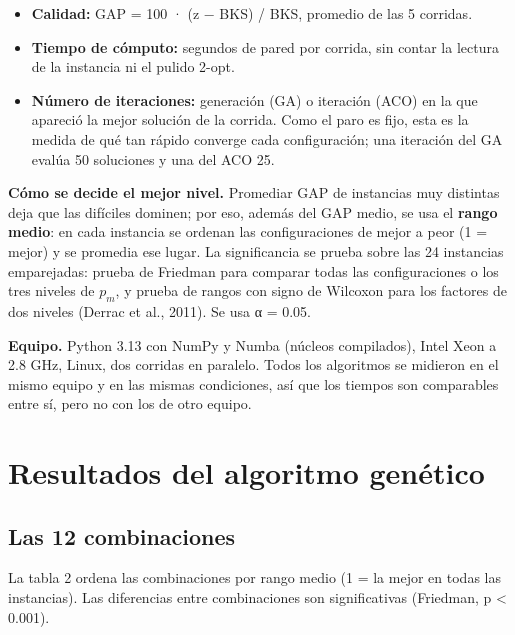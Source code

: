 \documentclass[11pt,letterpaper]{article}
\providecommand{\tightlist}{\setlength{\itemsep}{0pt}\setlength{\parskip}{0pt}}
\begin{document}
\begin{itemize}
\tightlist
\item
  \textbf{Calidad:} GAP = 100 · (z − BKS) / BKS, promedio de las 5 corridas.
\item
  \textbf{Tiempo de cómputo:} segundos de pared por corrida, sin contar la lectura de la instancia ni el pulido 2-opt.
\item
  \textbf{Número de iteraciones:} generación (GA) o iteración (ACO) en la que apareció la mejor solución de la corrida. Como el paro es fijo, esta es la medida de qué tan rápido converge cada configuración; una iteración del GA evalúa 50 soluciones y una del ACO 25.
\end{itemize}

\textbf{Cómo se decide el mejor nivel.} Promediar GAP de instancias muy distintas deja que las difíciles dominen; por eso, además del GAP medio, se usa el \textbf{rango medio}: en cada instancia se ordenan las configuraciones de mejor a peor (1 = mejor) y se promedia ese lugar. La significancia se prueba sobre las 24 instancias emparejadas: prueba de Friedman para comparar todas las configuraciones o los tres niveles de \(p_{m}\), y prueba de rangos con signo de Wilcoxon para los factores de dos niveles (Derrac et al., 2011). Se usa α = 0.05.

\textbf{Equipo.} Python 3.13 con NumPy y Numba (núcleos compilados), Intel Xeon a 2.8 GHz, Linux, dos corridas en paralelo. Todos los algoritmos se midieron en el mismo equipo y en las mismas condiciones, así que los tiempos son comparables entre sí, pero no con los de otro equipo.

\hypertarget{resultados-del-algoritmo-genuxe9tico}{%
\section{Resultados del algoritmo genético}\label{resultados-del-algoritmo-genuxe9tico}}

\hypertarget{las-12-combinaciones}{%
\subsection{Las 12 combinaciones}\label{las-12-combinaciones}}

La tabla 2 ordena las combinaciones por rango medio (1 = la mejor en todas las instancias). Las diferencias entre combinaciones son significativas (Friedman, p \textless{} 0.001).
\end{document}

